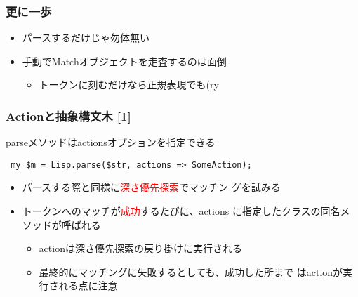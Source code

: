 \documentclass[14pt,dvipdfm,trans]{beamer}
\begin{document}
\begin{frame}
 \frametitle{更に一歩}
\begin{itemize}
 \item <1-> パースするだけじゃ勿体無い
 \vspace{0.5zh}
 \item <2-> 手動でMatchオブジェクトを走査するのは面倒
       \begin{itemize}
	\item <3-> トークンに刻むだけなら正規表現でも(ry
       \end{itemize}
\end{itemize}
\pause
\vspace{2zh}
\hspace{2zh}
\end{frame}

\begin{frame}[fragile]
 \frametitle{Actionと抽象構文木 [1]}
parseメソッドはactionsオプションを指定できる
\vspace{1zh}
\begin{lstlisting}
 my $m = Lisp.parse($str, actions => SomeAction);
\end{lstlisting}
\pause
\begin{itemize}
 \item <2-> パースする際と同様に\textcolor{red}{深さ優先探索}でマッチン
       グを試みる
 \item <3-> トークンへのマッチが\textcolor{red}{成功}するたびに、actions
       に指定したクラスの同名メソッドが呼ばれる
       \vspace{1zh}
       \begin{itemize}
	\item <4-> actionは深さ優先探索の戻り掛けに実行される
	      \vspace{0.5zh}
	\item <5-> 最終的にマッチングに失敗するとしても、成功した所まで
	      はactionが実行される点に注意
       \end{itemize}
\end{itemize}
\end{frame}
\end{document}
